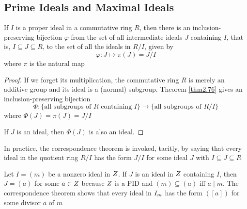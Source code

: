 \documentclass[11pt]{article}
\begin{document}
\subsection{Prime Ideals and Maximal Ideals}
\label{sec:org89aac70}
\begin{proposition}
If \(I\) is a proper ideal in a commutative ring \(R\), then there is an
inclusion-preserving bijection \(\varphi\) from the set of all intermediate ideals \(J\)
containing \(I\), that is, \(I\subseteq J\subseteq R\), to the set of all the
ideals in \(R/I\), given by
\begin{equation*}
\varphi:J\mapsto\pi(J)=J/I
\end{equation*}
where \(\pi\) is the natural map
\begin{center}
\end{center}
\end{proposition}

\begin{proof}
If we forget its multiplication, the commutative ring \(R\) is merely an
additive group and its ideal is a (normal) subgroup. Theorem \ref{thm2.76}
gives an inclusion-preserving bijection
\begin{equation*}
\Phi:\{\text{all subgroups of $R$ containing $I$}\}\to 
\{\text{all subgroups of $R/I$}\}
\end{equation*}
where \(\Phi(J)=\pi(J)=J/I\)

If \(J\) is an ideal, then \(\Phi(J)\) is also an ideal.
\end{proof}

In practice, the correspondence theorem is invoked, tacitly, by saying that
every ideal in the quotient ring \(R/I\) has the form \(J/I\) for some ideal
\(J\) with \(I\subseteq J\subseteq R\)

\begin{examplle}[]
Let \(I=(m)\) be a nonzero ideal in \(\relax{Z}\). If \(J\) is an ideal in \(\relax{Z}\)
containing \(I\), then \(J=(a)\) for some \(a\in\relax{Z}\) because \(\relax{Z}\) is a PID
and \((m)\subseteq(a)\) iff \(a\mid m\). The correspondence theorem shows
that every ideal in \(\relax{I}_m\) has the form \(([a])\) for some divisor \(a\) of \(m\)
\end{examplle}
\end{document}
